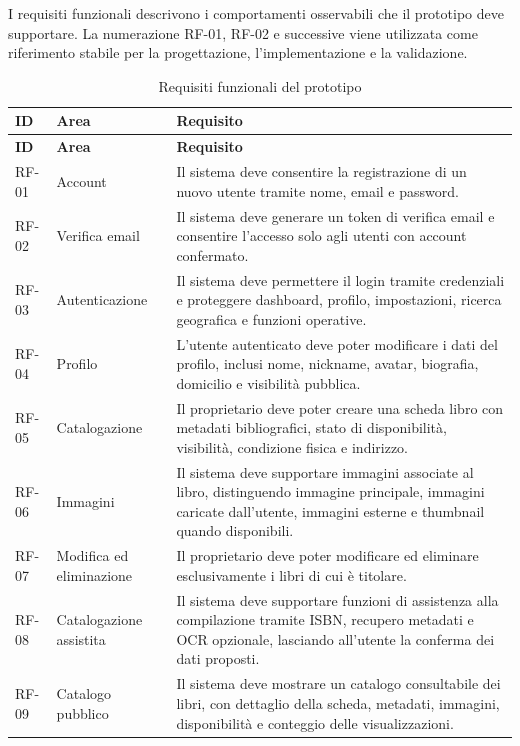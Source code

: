 I requisiti funzionali descrivono i comportamenti osservabili che il prototipo deve supportare. La numerazione RF-01, RF-02 e successive viene utilizzata come riferimento stabile per la progettazione, l'implementazione e la validazione.

\begin{longtable}{p{}p{}p{}}
    \caption{Requisiti funzionali del prototipo}
    \label{tab:requisiti-funzionali} \\
    \toprule
    \textbf{ID} & \textbf{Area} & \textbf{Requisito} \\
    \midrule
    \endfirsthead
    \toprule
    \textbf{ID} & \textbf{Area} & \textbf{Requisito} \\
    \midrule
    \endhead
    RF-01 & Account & Il sistema deve consentire la registrazione di un nuovo utente tramite nome, email e password. \\
    RF-02 & Verifica email & Il sistema deve generare un token di verifica email e consentire l'accesso solo agli utenti con account confermato. \\
    RF-03 & Autenticazione & Il sistema deve permettere il login tramite credenziali e proteggere dashboard, profilo, impostazioni, ricerca geografica e funzioni operative. \\
    RF-04 & Profilo & L'utente autenticato deve poter modificare i dati del profilo, inclusi nome, nickname, avatar, biografia, domicilio e visibilità pubblica. \\
    RF-05 & Catalogazione & Il proprietario deve poter creare una scheda libro con metadati bibliografici, stato di disponibilità, visibilità, condizione fisica e indirizzo. \\
    RF-06 & Immagini & Il sistema deve supportare immagini associate al libro, distinguendo immagine principale, immagini caricate dall'utente, immagini esterne e thumbnail quando disponibili. \\
    RF-07 & Modifica ed eliminazione & Il proprietario deve poter modificare ed eliminare esclusivamente i libri di cui è titolare. \\
    RF-08 & Catalogazione assistita & Il sistema deve supportare funzioni di assistenza alla compilazione tramite ISBN, recupero metadati e OCR opzionale, lasciando all'utente la conferma dei dati proposti. \\
    RF-09 & Catalogo pubblico & Il sistema deve mostrare un catalogo consultabile dei libri, con dettaglio della scheda, metadati, immagini, disponibilità e conteggio delle visualizzazioni. \\

\end{longtable}

